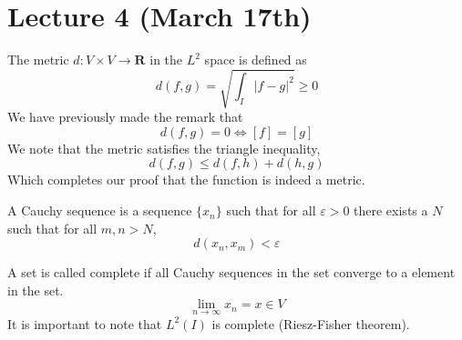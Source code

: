 \section{Lecture 4 (March 17th)}
\begin{rmk}
The metric $d:V\times V\rightarrow {\bm R}$ in the $L^2$ space is defined as
\[d(f,g)=\sqrt{\int _{I}|f-g|^2}\geq 0\]
We have previously made the remark that
\[d(f,g)=0\iff [f]=[g]\]
We note that the metric satisfies the triangle inequality,
\[d(f,g)\leq d(f,h)+d(h,g)\]
Which completes our proof that the function is indeed a metric. 
\end{rmk}
\vspace{2ex}
\begin{defi}
A Cauchy sequence is a sequence $\{x_{n}\}$ such that for all $\varepsilon >0$ there exists a $N$ such that for all $m,n>N$,
\[d(x_{n},x_{m})<\varepsilon \]
\end{defi}
\vspace{2ex}
\begin{defi}
A set is called complete if all Cauchy sequences in the set converge to a element in the set.
\[\lim _{n\rightarrow \infty }x_{n}=x\in V\]
It is important to note that $L^2(I)$ is complete (Riesz-Fisher theorem). 
\end{defi}
\vspace{2ex}
